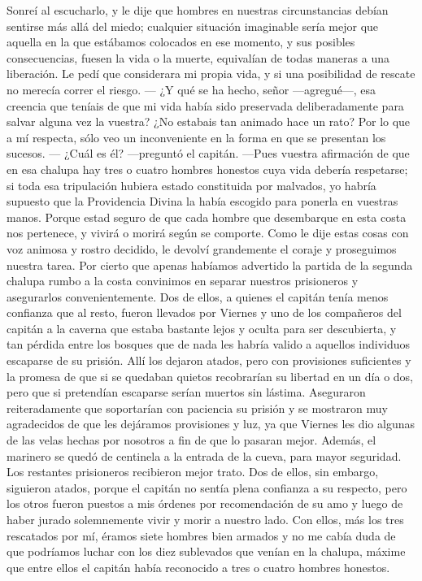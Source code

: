 \documentclass{novela}
\begin{document}
    Sonreí al escucharlo, y le dije que hombres en nuestras circunstancias debían sentirse más allá del miedo; cualquier situación imaginable sería mejor que aquella en la que estábamos colocados en ese momento, y sus posibles consecuencias, fuesen la vida o la muerte, equivalían de todas maneras a una liberación. Le pedí que considerara mi propia vida, y si una posibilidad de rescate no merecía correr el riesgo.
    — ¿Y qué se ha hecho, señor —agregué—, esa creencia que teníais de que mi vida había sido preservada deliberadamente para salvar alguna vez la vuestra? ¿No estabais tan animado hace un rato? Por lo que a mí respecta, sólo veo un inconveniente en la forma en que se presentan los sucesos.
    — ¿Cuál es él? —preguntó el capitán. —Pues vuestra afirmación de que en esa chalupa hay tres o cuatro hombres honestos cuya vida debería respetarse; si toda esa tripulación hubiera estado constituida por malvados, yo habría supuesto que la Providencia Divina la había escogido para ponerla en vuestras manos. Porque estad seguro de que cada hombre que desembarque en esta costa nos pertenece, y vivirá o morirá según se comporte.
    Como le dije estas cosas con voz animosa y rostro decidido, le devolví grandemente el coraje y proseguimos nuestra tarea.
    Por cierto que apenas habíamos advertido la partida de la segunda chalupa rumbo a la costa convinimos en separar nuestros prisioneros y asegurarlos convenientemente.
    Dos de ellos, a quienes el capitán tenía menos confianza que al resto, fueron llevados por Viernes y uno de los compañeros del capitán a la caverna que estaba bastante lejos y oculta para ser descubierta, y tan pérdida entre los bosques que de nada les habría valido a aquellos individuos escaparse de su prisión.
    Allí los dejaron atados, pero con provisiones suficientes y la promesa de que si se quedaban quietos recobrarían su libertad en un día o dos, pero que si pretendían escaparse serían muertos sin lástima. Aseguraron reiteradamente que soportarían con paciencia su prisión y se mostraron muy agradecidos de que les dejáramos provisiones y luz, ya que Viernes les dio algunas de las velas hechas por nosotros a fin de que lo pasaran mejor. Además, el marinero se quedó de centinela a la entrada de la cueva, para mayor seguridad.
    Los restantes prisioneros recibieron mejor trato. Dos de ellos, sin embargo, siguieron atados, porque el capitán no sentía plena confianza a su respecto, pero los otros fueron puestos a mis órdenes por recomendación de su amo y luego de haber jurado solemnemente vivir y morir a nuestro lado. Con ellos, más los tres rescatados por mí, éramos siete hombres bien armados y no me cabía duda de que podríamos luchar con los diez sublevados que venían en la chalupa, máxime que entre ellos el capitán había reconocido a tres o cuatro hombres honestos.
\end{document}
